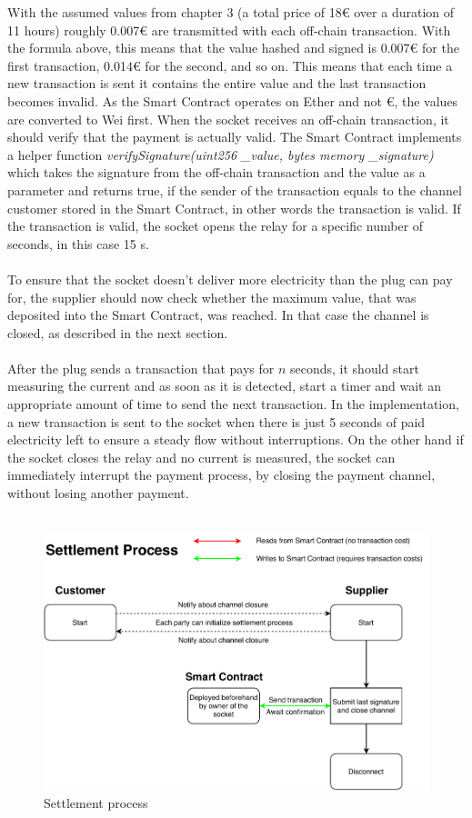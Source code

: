 With the assumed values from chapter 3 (a total price of 18\euro{} over a duration of 11 hours) roughly 0.007\euro{} are transmitted with each off-chain transaction. With the formula above, this means that the value hashed and signed is 0.007\euro{} for the first transaction, 0.014\euro{} for the second, and so on. This means that each time a new transaction is sent it contains the entire value and the last transaction becomes invalid. As the Smart Contract operates on Ether and not \euro, the values are converted to Wei first. When the socket receives an off-chain transaction, it should verify that the payment is actually valid. The Smart Contract implements a helper function \textit{verifySignature(uint256 \_value, bytes memory \_signature)} which takes the signature from the off-chain transaction and the value as a parameter and returns true, if the sender of the transaction equals to the channel customer stored in the Smart Contract, in other words the transaction is valid. If the transaction is valid, the socket opens the relay for a specific number of seconds, in this case 15 s.
\\\\
To ensure that the socket doesn’t deliver more electricity than the plug can pay for, the supplier should now check whether the maximum value, that was deposited into the Smart Contract, was reached. In that case the channel is closed, as described in the next section.
\\\\
After the plug sends a transaction that pays for $n$ seconds, it should start measuring the current and as soon as it is detected, start a timer and wait an appropriate amount of time to send the next transaction. In the implementation, a new transaction is sent to the socket when there is just 5 seconds of paid electricity left to ensure a steady flow without interruptions. On the other hand if the socket closes the relay and no current is measured, the socket can immediately interrupt the payment process, by closing the payment channel, without losing another payment. 
\\\\
\begin{figure}[H]
    \includegraphics[width=\textwidth]{img/Plug-Socket-settlement_process.pdf}
    \caption{Settlement process}
    \label{fig:settlement_process}
\end{figure}
